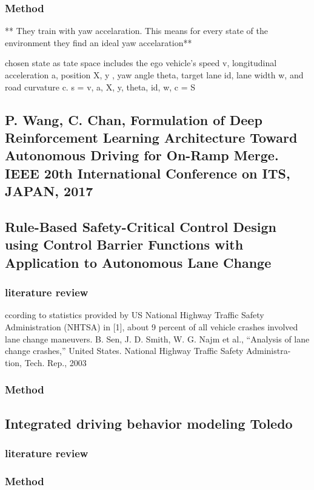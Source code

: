 \documentclass{article}
\begin{document}
\subsubsection{Method}
** They train with yaw accelaration. This means for every state of the environment they find an ideal yaw accelaration**

chosen state as tate space includes the ego vehicle’s speed
v, longitudinal acceleration a, position X, y , yaw angle
theta, target lane id, lane width w, and road curvature c.
s = v, a, X, y, theta, id, w, c =  S

\subsection{P. Wang, C. Chan, Formulation of Deep Reinforcement Learning
Architecture Toward Autonomous Driving for On-Ramp Merge.
IEEE 20th International Conference on ITS, JAPAN, 2017}

  \subsection{Rule-Based Safety-Critical Control Design using Control Barrier
Functions with Application to Autonomous Lane Change}
    \subsubsection{literature review}
    ccording to
statistics provided by US National Highway Traffic Safety
Administration (NHTSA) in [1], about 9 percent of all vehicle
crashes involved lane change maneuvers. B. Sen, J. D. Smith, W. G. Najm et al., “Analysis of lane change
crashes,” United States. National Highway Traffic Safety Administra-
tion, Tech. Rep., 2003
\subsubsection{Method}
  \subsection{Integrated driving behavior modeling Toledo}
    \subsubsection{literature review}
\subsubsection{Method}
  
\end{document}

